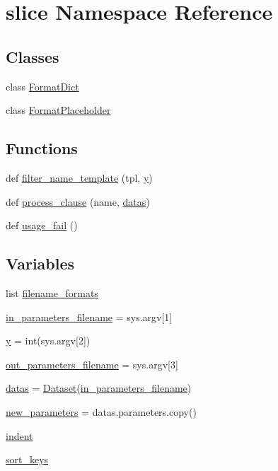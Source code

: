 \hypertarget{namespaceslice}{}\section{slice Namespace Reference}
\label{namespaceslice}
\subsection*{Classes}
\begin{DoxyCompactItemize}
\item 
class \hyperlink{classslice_1_1FormatDict}{Format\+Dict}
\item 
class \hyperlink{classslice_1_1FormatPlaceholder}{Format\+Placeholder}
\end{DoxyCompactItemize}
\subsection*{Functions}
\begin{DoxyCompactItemize}
\item 
def \hyperlink{namespaceslice_a3819ee6d137a7f5b97b9488b87210a02}{filter\+\_\+name\+\_\+template} (tpl, \hyperlink{namespaceslice_ae7917a4598035a46a8221bbf9464973a}{y})
\item 
def \hyperlink{namespaceslice_a8c750488ae8c047bc098177b8a74bb42}{process\+\_\+clause} (name, \hyperlink{namespaceslice_a17ebf104aabeed4f05a67326d8a8c3f1}{datas})
\item 
def \hyperlink{namespaceslice_a79726b3bc823851fad7672cf36f9d8ec}{usage\+\_\+fail} ()
\end{DoxyCompactItemize}
\subsection*{Variables}
\begin{DoxyCompactItemize}
\item 
list \hyperlink{namespaceslice_aebcb39fc7f02a12d61c8045af43157e3}{filename\+\_\+formats}
\item 
\hyperlink{namespaceslice_aa2f432535d0edfe6db111302bb8d9469}{in\+\_\+parameters\+\_\+filename} = sys.\+argv\mbox{[}1\mbox{]}
\item 
\hyperlink{namespaceslice_ae7917a4598035a46a8221bbf9464973a}{y} = int(sys.\+argv\mbox{[}2\mbox{]})
\item 
\hyperlink{namespaceslice_acc58115186fa9eb18f9d1cbf673409aa}{out\+\_\+parameters\+\_\+filename} = sys.\+argv\mbox{[}3\mbox{]}
\item 
\hyperlink{namespaceslice_a17ebf104aabeed4f05a67326d8a8c3f1}{datas} = \hyperlink{classpylib_1_1dataset_1_1Dataset}{Dataset}(\hyperlink{namespaceslice_aa2f432535d0edfe6db111302bb8d9469}{in\+\_\+parameters\+\_\+filename})
\item 
\hyperlink{namespaceslice_a523f634f70d01b5c0f2c7c70a28eabee}{new\+\_\+parameters} = datas.\+parameters.\+copy()
\item 
\hyperlink{namespaceslice_ab212c25c857f17fc36392cff92c3d93d}{indent}
\item 
\hyperlink{namespaceslice_ae580944fe01b0f1fa0e9acbbdfda532c}{sort\+\_\+keys}
\end{DoxyCompactItemize}


